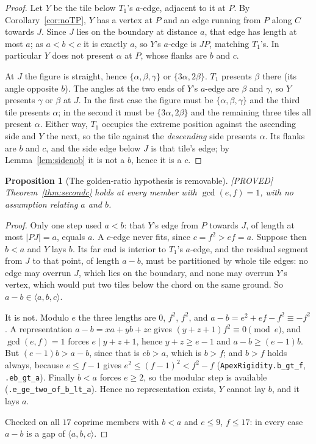 \documentclass[11pt,reqno]{amsart}
\theoremstyle{plain}
\newtheorem{proposition}[theorem]{Proposition}
\theoremstyle{definition}
\newcommand{\lab}[1]{\hfill\textnormal{\footnotesize\textsc{[#1]}}}
\begin{document}
\begin{proof}
Let $Y$ be the tile below $T_1$'s $a$-edge, adjacent to it at $P$. By Corollary~\ref{cor:noTP}, $Y$ has
a vertex at $P$ and an edge running from $P$ along $C$ towards $J$. Since $J$ lies on the boundary at
distance $a$, that edge has length at most $a$; as $a<b<c$ it is exactly $a$, so $Y$'s $a$-edge is
$JP$, matching $T_1$'s. In particular $Y$ does not present $\alpha$ at $P$, whose flanks are $b$ and
$c$.

At $J$ the figure is straight, hence $\{\alpha,\beta,\gamma\}$ or $\{3\alpha,2\beta\}$. $T_1$ presents
$\beta$ there (its angle opposite $b$). The angles at the two ends of $Y$'s $a$-edge are $\beta$ and
$\gamma$, so $Y$ presents $\gamma$ or $\beta$ at $J$. In the first case the figure must be
$\{\alpha,\beta,\gamma\}$ and the third tile presents $\alpha$; in the second it must be
$\{3\alpha,2\beta\}$ and the remaining three tiles all present $\alpha$. Either way, $T_1$ occupies the
extreme position against the ascending side and $Y$ the next, so the tile against the \emph{descending}
side presents $\alpha$. Its flanks are $b$ and $c$, and the side edge below $J$ is that tile's edge; by
Lemma~\ref{lem:sidenob} it is not a $b$, hence it is a $c$.
\end{proof}

\begin{proposition}[The golden-ratio hypothesis is removable]\label{prop:nogolden}\lab{PROVED}
Theorem~\ref{thm:secondc} holds at every member with $\gcd(e,f)=1$, with no assumption relating $a$
and $b$.
\end{proposition}

\begin{proof}
Only one step used $a<b$: that $Y$'s edge from $P$ towards $J$, of length at most $|PJ|=a$, equals
$a$. A $c$-edge never fits, since $c=f^{2}>ef=a$. Suppose then $b<a$ and $Y$ lays $b$. Its far end is
interior to $T_1$'s $a$-edge, and the residual segment from $J$ to that point, of length $a-b$, must be
partitioned by whole tile edges: no edge may overrun $J$, which lies on the boundary, and none may
overrun $Y$'s vertex, which would put two tiles below the chord on the same ground. So
$a-b\in\langle a,b,c\rangle$.

It is not. Modulo $e$ the three lengths are $0$, $f^{2}$, $f^{2}$, and $a-b=e^{2}+ef-f^{2}\equiv-f^{2}$.
A representation $a-b=xa+yb+zc$ gives $(y+z+1)f^{2}\equiv0 \pmod e$, and $\gcd(e,f)=1$ forces
$e\mid y+z+1$, hence $y+z\ge e-1$ and $a-b\ge(e-1)b$. But $(e-1)b>a-b$, since that is $eb>a$, which is
$b>f$; and $b>f$ holds always, because $e\le f-1$ gives $e^{2}\le(f-1)^{2}<f^{2}-f$
(\texttt{ApexRigidity.b\_gt\_f}, \texttt{.eb\_gt\_a}). Finally $b<a$ forces $e\ge2$, so the modular step
is available (\texttt{.e\_ge\_two\_of\_b\_lt\_a}). Hence no representation exists, $Y$ cannot lay $b$,
and it lays $a$.

Checked on all $17$ coprime members with $b<a$ and $e\le9$, $f\le17$: in every case $a-b$ is a gap of
$\langle a,b,c\rangle$.
\end{proof}
\end{document}
